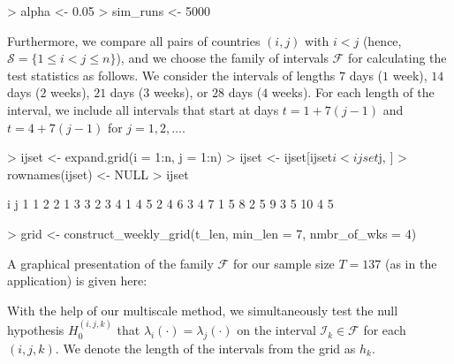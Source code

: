 \documentclass[a4paper]{article}
\begin{document}
\begin{Schunk}
\begin{Sinput}
> alpha    <- 0.05
> sim_runs <- 5000
\end{Sinput}
\end{Schunk}

Furthermore, we compare all pairs of countries $(i,j)$ with $i < j$ (hence, $\mathcal{S} = \{1 \leq i < j \leq n\}$), and we choose the family of intervals $\mathcal{F}$ for calculating the test statistics as follows. We consider the intervals of lengths $7$ days ($1$ week), $14$ days ($2$ weeks), $21$ days ($3$ weeks), or $28$ days ($4$ weeks). For each length of the interval, we include all intervals that start at days $t = 1 + 7(j-1)$ and $t = 4 + 7(j-1)$ for $j=1,2,\ldots$.

\begin{Schunk}
\begin{Sinput}
> ijset           <- expand.grid(i = 1:n, j = 1:n)
> ijset           <- ijset[ijset$i < ijset$j, ]
> rownames(ijset) <- NULL
> ijset
\end{Sinput}
\begin{Soutput}
   i j
1  1 2
2  1 3
3  2 3
4  1 4
5  2 4
6  3 4
7  1 5
8  2 5
9  3 5
10 4 5
\end{Soutput}
\begin{Sinput}
> grid <- construct_weekly_grid(t_len, min_len = 7, nmbr_of_wks = 4)
\end{Sinput}
\end{Schunk}

A graphical presentation of the family $\mathcal{F}$ for our sample size $T = 137$ (as in the application) is given here:
\begin{Schunk}
\end{Schunk}

With the help of our multiscale method, we simultaneously test the null hypothesis $H_0^{(i, j, k)}$ that $\lambda_i(\cdot) = \lambda_j(\cdot)$ on the interval $_k \in {}$ for each $(i, j, k)$. We denote the length of the intervals from the grid as $h_k$.
\end{document}
